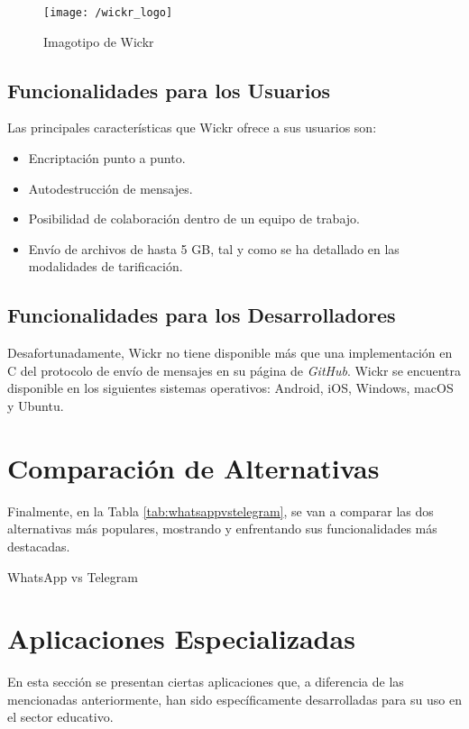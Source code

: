 \begin{figure}[!h]
	\begin{center}
		\texttt{[image: /wickr\_logo]}
		\caption{Imagotipo de Wickr}
		\label{fig:wickr}
	\end{center}
\end{figure}

\subsection{Funcionalidades para los Usuarios}
Las principales características que Wickr ofrece a sus usuarios son:

\begin{itemize}
	\item Encriptación punto a punto.
	\item Autodestrucción de mensajes.
	\item Posibilidad de colaboración dentro de un equipo de trabajo.
	\item Envío de archivos de hasta 5 \acs{GB}, tal y como se ha detallado en las modalidades de tarificación.
\end{itemize}

\subsection{Funcionalidades para los Desarrolladores}
Desafortunadamente, Wickr no tiene disponible más que una implementación en C del protocolo de envío de mensajes en su página de \textit{GitHub}. Wickr se encuentra disponible en los siguientes sistemas operativos: Android, iOS, Windows, macOS y Ubuntu.

\newpage

\section{Comparación de Alternativas}
Finalmente, en la Tabla \ref{tab:whatsappvstelegram}, se van a comparar las dos alternativas más populares, mostrando y enfrentando sus funcionalidades más destacadas.

\begin{table}[hp]
	\centering
	{\small
		
	}
	\caption[WhatsApp vs Telegram]
	{WhatsApp vs Telegram}
	\label{tab:whatsappvstelegram}
\end{table}

\newpage

\section{Aplicaciones Especializadas}
En esta sección se presentan ciertas aplicaciones que, a diferencia de las mencionadas anteriormente, han sido específicamente desarrolladas para su uso en el sector educativo.

